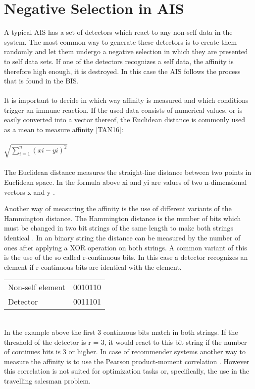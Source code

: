 \section{Negative Selection in AIS}

A typical AIS has a set of detectors which react to any non-self data in the system. The most common way to generate these detectors is to create them randomly and let them undergo a negative selection in which they are presented to self data sets. If one of the detectors recognizes a self data, the affinity is therefore high enough, it is destroyed. In this case the AIS follows the process that is found in the BIS.\\\\ 
It is important to decide in which way affinity is measured and which conditions trigger an immune reaction. If the used data consists of numerical values, or is easily converted into a vector thereof, the Euclidean distance \cite{howard} is commonly used as a mean to measure affinity [TAN16]:\\\\
\begin{math}
\sqrt{\sum_{i=1}^{n}(xi-yi)^2}
\end{math}\\\\
The Euclidean distance measures the straight-line distance between two points in Euclidean space. In the formula above xi and yi are values of two n-dimensional vectors x and y \cite{howard}.  

Another way of measuring the affinity is the use of different variants of the Hammington distance. The Hammington distance is the number of bits which must be changed in two bit strings of the same length to make both strings identical \cite{hammington}. In an binary string the distance can be measured by the number of ones after applying a XOR operation on both strings. A common variant of this is the use of the so called r-continuous bits. In this case a detector recognizes an element if r-continuous bits are identical with the element.\\
\begin{table*}[htbp]
	\begin{tabular}{ll}
Non-self element & 0010110\\
Detector & 0011101
	\end{tabular}
\end{table*}\\
In the example above the first 3 continuous bits match in both strings. If the threshold of the detector is r = 3, it would react to this bit string if the number of continues bits is 3 or higher.
In case of recommender systems another way to measure the affinity is to use the Pearson product-moment correlation \cite{pearson}. However this correlation is not suited for optimization tasks or, specifically, the use in the travelling salesman problem. 
